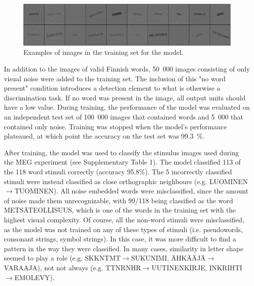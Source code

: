 \documentclass[a4paper, 10pt]{vanvliet_paper}
\begin{document}
\begin{figure}[b]
    \includegraphics[width=\textwidth]{train.png}
    \caption{Examples of images in the training set for the model.}\label{fig:train}
\end{figure}

In addition to the images of valid Finnish words, 50~000 images consisting of only visual noise were added to the training set.
The inclusion of this "no word present" condition introduces a detection element to what is otherwise a discrimination task.
If no word was present in the image, all output units should have a low value.
During training, the performance of the model was evaluated on an independent test set of 100~000 images that contained words and 5~000 that contained only noise.
Training was stopped when the model's performance plateaued, at which point the accuracy on the test set was \SI{99.3}{\percent}.

After training, the model was used to classify the stimulus images used during the \gls{MEG} experiment (see Supplementary Table 1).
The model classified 113 of the 118 word stimuli correctly (accuracy 95.8\%).
The 5 incorrectly classified stimuli were instead classified as close orthographic neighbours (e.g. LUOMINEN$\rightarrow$TUOMINEN).
All noise embedded words were misclassified, since the amount of noise made them unrecognizable, with 99/118 being classified as the word METSÄTEOLLISUUS, which is one of the words in the training set with the highest visual complexity.
Of course, all the non-word stimuli were misclassified, as the model was not trained on any of these types of stimuli (i.e. pseudowords, consonant strings, symbol strings).
In this case, it was more difficult to find a pattern in the way they were classified.
In many cases, similarity in letter shape seemed to play a role (e.g. SKKNTMT$\rightarrow$SUKUNIMI, ÄHKÄÄJÄ$\rightarrow$VARAAJA), not not always (e.g. TTNRNHR$\rightarrow$UUTINENKIRJE, INKRIHTI$\rightarrow$EMOLEVY).
\end{document}

